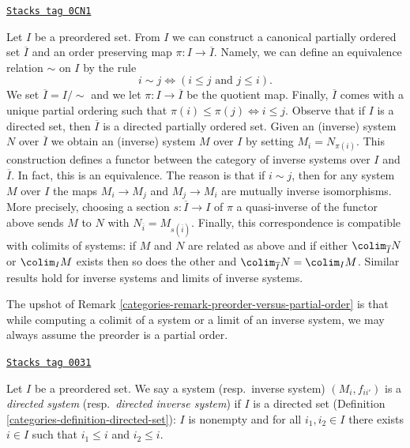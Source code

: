 \begin{remark}
\label{categories-remark-preorder-versus-partial-order}
\href{https://stacks.math.columbia.edu/tag/0CN1}{\texttt{Stacks tag 0CN1}}

Let $I$ be a preordered set. From $I$ we can construct a canonical
partially ordered set $\overline{I}$ and an order preserving map
$\pi : I \to \overline{I}$. Namely, we can define an equivalence
relation $\sim$ on $I$ by the rule
$$
i \sim j \Leftrightarrow (i \leq j\text{ and }j \leq i).
$$
We set $\overline{I} = I/\sim$ and we let $\pi : I \to \overline{I}$
be the quotient map. Finally, $\overline{I}$ comes with a unique
partial ordering such that
$\pi(i) \leq \pi(j) \Leftrightarrow i \leq j$.
Observe that if $I$ is a directed set, then $\overline{I}$
is a directed partially ordered set.
Given an (inverse) system $N$ over $\overline{I}$ we obtain an
(inverse) system $M$ over $I$ by setting $M_i = N_{\pi(i)}$.
This construction defines a functor between the category
of inverse systems over $I$ and $\overline{I}$.
In fact, this is an equivalence.
The reason is that if $i \sim j$, then for any system
$M$ over $I$ the maps $M_i \to M_j$ and $M_j \to M_i$ are
mutually inverse isomorphisms. More precisely, choosing
a section $s : \overline{I} \to I$ of $\pi$ a quasi-inverse
of the functor above sends $M$ to $N$ with
$N_{\overline{i}} = M_{s(\overline{i})}$.
Finally, this correspondence is compatible with colimits of systems:
if $M$ and $N$ are related as above and
if either $\colim_{\overline{I}} N$ or $\colim_I M$ exists
then so does the other and
$\colim_{\overline{I}} N = \colim_I M$.
Similar results hold for inverse systems and limits of inverse systems.
\end{remark}

The upshot of Remark \ref{categories-remark-preorder-versus-partial-order}
is that while computing a colimit of a system or a limit of
an inverse system, we may always assume the preorder is a partial order.

\begin{definition}
\label{categories-definition-directed-system}
\href{https://stacks.math.columbia.edu/tag/0031}{\texttt{Stacks tag 0031}}

Let $I$ be a preordered set. We say a system (resp.\ inverse system)
$(M_i, f_{ii'})$ is a
{\it directed system} (resp.\ {\it directed inverse system})
if $I$ is a directed set
(Definition \ref{categories-definition-directed-set}): $I$ is nonempty and
for all $i_1, i_2 \in I$ there exists $i\in I$ such that
$i_1 \leq i$ and $i_2 \leq i$.
\end{definition}

